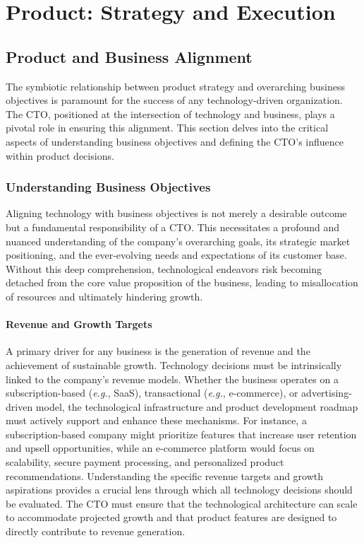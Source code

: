 \chapter{Product: Strategy and Execution}


\section{Product and Business Alignment}

The symbiotic relationship between product strategy and overarching business objectives is paramount for the success of any technology-driven organization. The \gls{CTO}, positioned at the intersection of technology and business, plays a pivotal role in ensuring this alignment. This section delves into the critical aspects of understanding business objectives and defining the \gls{CTO}'s influence within product decisions.

\subsection{Understanding Business Objectives}
Aligning technology with business objectives is not merely a desirable outcome but a fundamental responsibility of a \gls{CTO}. This necessitates a profound and nuanced understanding of the company's overarching goals, its strategic market positioning, and the ever-evolving needs and expectations of its customer base. Without this deep comprehension, technological endeavors risk becoming detached from the core value proposition of the business, leading to misallocation of resources and ultimately hindering growth.

\subsubsection{Revenue and Growth Targets}
A primary driver for any business is the generation of revenue and the achievement of sustainable growth. Technology decisions must be intrinsically linked to the company's revenue models. Whether the business operates on a subscription-based (\textit{e.g.}, \gls{SaaS}), transactional (\textit{e.g.}, e-commerce), or advertising-driven model, the technological infrastructure and product development roadmap must actively support and enhance these mechanisms. For instance, a subscription-based company might prioritize features that increase user retention and upsell opportunities, while an e-commerce platform would focus on scalability, secure payment processing, and personalized product recommendations. Understanding the specific revenue targets and growth aspirations provides a crucial lens through which all technology decisions should be evaluated. The \gls{CTO} must ensure that the technological architecture can scale to accommodate projected growth and that product features are designed to directly contribute to revenue generation.


